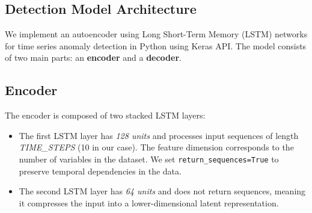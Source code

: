 \subsection{Detection Model Architecture}




We implement an autoencoder using Long Short-Term Memory (LSTM) networks for time series anomaly detection in Python using Keras API. The model consists of two main parts: an \textbf{encoder} and a \textbf{decoder}.  

\subsection*{Encoder}  
The encoder is composed of two stacked LSTM layers:  
\begin{itemize}  
    \item The first LSTM layer has \textit{128 units} and processes input sequences of length \textit{TIME\_STEPS} (10 in our case). The feature dimension corresponds to the number of variables in the dataset. We set \texttt{return\_sequences=True} to preserve temporal dependencies in the data.  
    \item The second LSTM layer has \textit{64 units} and does not return sequences, meaning it compresses the input into a lower-dimensional latent representation.  
\end{itemize}  

